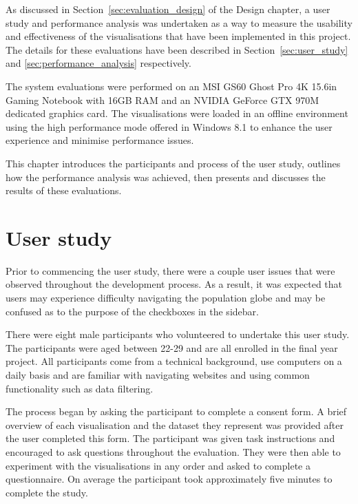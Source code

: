 
As discussed in Section~\ref{sec:evaluation_design} of the Design chapter, a user study and performance analysis was undertaken as a way to measure the usability and effectiveness of the visualisations that have been implemented in this project. The details for these evaluations have been described in Section~\ref{sec:user_study} and \ref{sec:performance_analysis} respectively.

The system evaluations were performed on an MSI GS60 Ghost Pro 4K 15.6in Gaming Notebook with 16GB RAM and an NVIDIA GeForce GTX 970M dedicated graphics card. The visualisations were loaded in an offline environment using the high performance mode offered in Windows 8.1 to enhance the user experience and minimise performance issues.

This chapter introduces the participants and process of the user study, outlines how the performance analysis was achieved, then presents and discusses the results of these evaluations.

\section{User study} {
\label{sec:user_study}

	Prior to commencing the user study, there were a couple user issues that were observed throughout the development process. As a result, it was expected that users may experience difficulty navigating the population globe and may be confused as to the purpose of the checkboxes in the sidebar.

	There were eight male participants who volunteered to undertake this user study. The participants were aged between 22-29 and are all enrolled in the final year project. All participants come from a technical background, use computers on a daily basis and are familiar with navigating websites and using common functionality such as data filtering.

	The process began by asking the participant to complete a consent form. A brief overview of each visualisation and the dataset they represent was provided after the user completed this form. The participant was given task instructions and encouraged to ask questions throughout the evaluation. They were then able to experiment with the visualisations in any order and asked to complete a questionnaire. On average the participant took approximately five minutes to complete the study.

}

